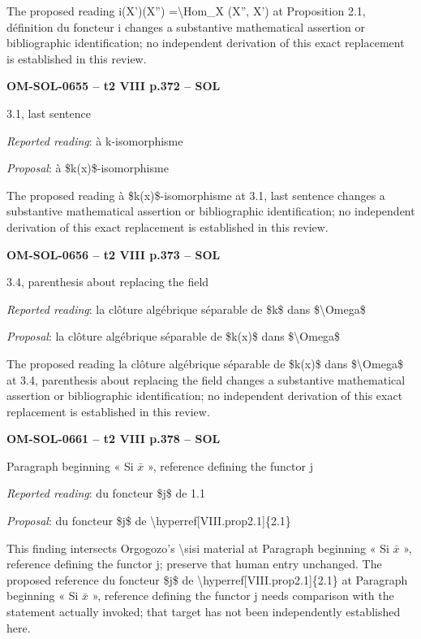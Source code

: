 The proposed reading i(X')(X'') =\allowbreak  \textbackslash{}Hom\_X (X'', X') at Proposition 2.1, définition du foncteur i changes a substantive mathematical assertion or bibliographic identification; no independent derivation of this exact replacement is established in this review.\par
\par\noindent\textbf{OM-SOL-0655 -- t2 VIII p.372 -- SOL}\par
3.1, last sentence\par
\emph{Reported reading}: à k-isomorphisme\par
\emph{Proposal}: à \$k(x)\$-isomorphisme\par
The proposed reading à \$k(x)\$-isomorphisme at 3.1, last sentence changes a substantive mathematical assertion or bibliographic identification; no independent derivation of this exact replacement is established in this review.\par
\par\noindent\textbf{OM-SOL-0656 -- t2 VIII p.373 -- SOL}\par
3.4, parenthesis about replacing the field\par
\emph{Reported reading}: la clôture algébrique séparable de \$k\$ dans \$\textbackslash{}Omega\$\par
\emph{Proposal}: la clôture algébrique séparable de \$k(x)\$ dans \$\textbackslash{}Omega\$\par
The proposed reading la clôture algébrique séparable de \$k(x)\$ dans \$\textbackslash{}Omega\$ at 3.4, parenthesis about replacing the field changes a substantive mathematical assertion or bibliographic identification; no independent derivation of this exact replacement is established in this review.\par
\par\noindent\textbf{OM-SOL-0661 -- t2 VIII p.378 -- SOL}\par
Paragraph beginning « Si \ensuremath{\bar{x}} », reference defining the functor j\par
\emph{Reported reading}: du foncteur \$j\$ de 1.1\par
\emph{Proposal}: du foncteur \$j\$ de \textbackslash{}hyperref[VIII.prop2.1]\{2.1\}\par
This finding intersects Orgogozo's \textbackslash{}sisi material at Paragraph beginning « Si \ensuremath{\bar{x}} », reference defining the functor j; preserve that human entry unchanged. The proposed reference du foncteur \$j\$ de \textbackslash{}hyperref[VIII.prop2.1]\{2.1\} at Paragraph beginning « Si \ensuremath{\bar{x}} », reference defining the functor j needs comparison with the statement actually invoked; that target has not been independently established here.\par
